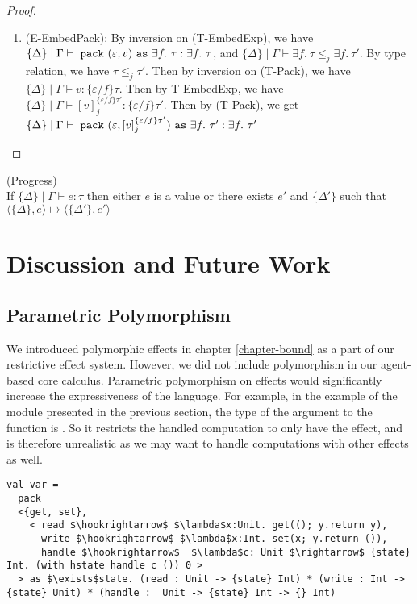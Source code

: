 \begin{lemma}
\begin{proof}
\begin{enumerate}
\item (E-EmbedPack): By inversion on (T-EmbedExp), we have $\{\Delta\} \mid \Gamma \vdash \ \texttt{pack}\  (\varepsilon, v) \ \texttt{as}\  \exists f.\ \tau : \exists f.\ \tau$, and $\{\Delta\} \mid \Gamma \vdash \exists f.\ \tau \leq_j \exists f.\ \tau'$. By type relation, we have $\tau \leq_j \tau'$. Then by inversion on (T-Pack), we have $\{\Delta\} \mid \Gamma \vdash v :\{\varepsilon / f\}\tau$. Then by T-EmbedExp, we have $\{\Delta\}\mid\Gamma \vdash [v]^{\{\varepsilon / f\}\tau'}_j : \{\varepsilon / f\}\tau'$. Then by (T-Pack), we get $\{\Delta\}\mid\Gamma \vdash \ \texttt{pack}\  (\varepsilon, [v]^{\{\varepsilon / f\}\tau'}_j) \ \texttt{as}\  \exists f.\ \tau' :\exists f.\ \tau'$


\end{enumerate}
\end{proof}

\end{lemma}

\begin{lemma} (Progress)\\
If $\{\Delta\} \mid \Gamma \vdash e : \tau$ then either $e$ is a value or there exists $e'$ and $\{\Delta'\}$ such that $\langle \{\Delta\}, e \rangle \mapsto \langle \{\Delta'\}, e' \rangle$
\end{lemma}

\section{Discussion and Future Work}

\subsection{Parametric Polymorphism}

We introduced polymorphic effects in chapter \ref{chapter-bound} as a part of our restrictive effect system. However, we did not include  polymorphism in our agent-based core calculus. Parametric polymorphism on effects would significantly increase the expressiveness of the language. For example, in the example of the  module presented in the previous section, the type of the argument to the  function is . So it restricts the handled computation to only have the  effect, and is therefore unrealistic as we may want to handle computations with other effects as well. 
\begin{lstlisting}[mathescape=true]
val var = 
  pack 
  <{get, set}, 
    < read $\hookrightarrow$ $\lambda$x:Unit. get((); y.return y),
      write $\hookrightarrow$ $\lambda$x:Int. set(x; y.return ()),
      handle $\hookrightarrow$  $\lambda$c: Unit $\rightarrow$ {state} Int. (with hstate handle c ()) 0 >
  > as $\exists$state. (read : Unit -> {state} Int) * (write : Int -> {state} Unit) * (handle :  Unit -> {state} Int -> {} Int)
\end{lstlisting} 

